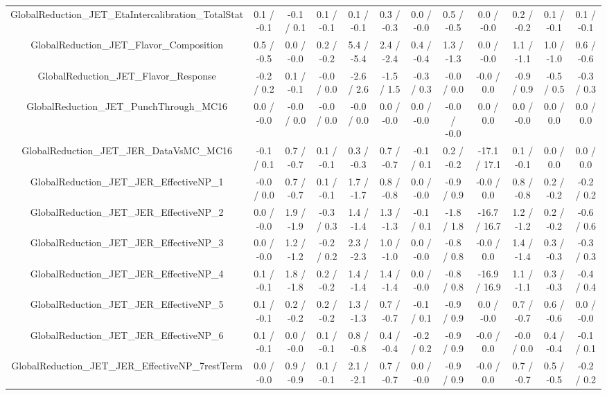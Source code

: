 \begin{table}[htbp]
\begin{center}
\begin{tabular}{|c|c|c|c|c|c|c|c|c|c|c|c|}
  GlobalReduction_JET_EtaIntercalibration_TotalStat & 0.1 / -0.1 & -0.1 / 0.1 & 0.1 / -0.1 & 0.1 / -0.1 & 0.3 / -0.3 & 0.0 / -0.0 & 0.5 / -0.5 & 0.0 / -0.0 & 0.2 / -0.2 & 0.1 / -0.1 & 0.1 / -0.1 \\ 
  GlobalReduction_JET_Flavor_Composition & 0.5 / -0.5 & 0.0 / -0.0 & 0.2 / -0.2 & 5.4 / -5.4 & 2.4 / -2.4 & 0.4 / -0.4 & 1.3 / -1.3 & 0.0 / -0.0 & 1.1 / -1.1 & 1.0 / -1.0 & 0.6 / -0.6 \\ 
  GlobalReduction_JET_Flavor_Response & -0.2 / 0.2 & 0.1 / -0.1 & -0.0 / 0.0 & -2.6 / 2.6 & -1.5 / 1.5 & -0.3 / 0.3 & -0.0 / 0.0 & -0.0 / 0.0 & -0.9 / 0.9 & -0.5 / 0.5 & -0.3 / 0.3 \\ 
  GlobalReduction_JET_PunchThrough_MC16 & 0.0 / -0.0 & -0.0 / 0.0 & -0.0 / 0.0 & -0.0 / 0.0 & 0.0 / -0.0 & 0.0 / -0.0 & -0.0 / -0.0 & 0.0 / 0.0 & 0.0 / -0.0 & 0.0 / 0.0 & 0.0 / 0.0 \\ 
  GlobalReduction_JET_JER_DataVsMC_MC16 & -0.1 / 0.1 & 0.7 / -0.7 & 0.1 / -0.1 & 0.3 / -0.3 & 0.7 / -0.7 & -0.1 / 0.1 & 0.2 / -0.2 & -17.1 / 17.1 & 0.1 / -0.1 & 0.0 / 0.0 & 0.0 / 0.0 \\ 
  GlobalReduction_JET_JER_EffectiveNP_1 & -0.0 / 0.0 & 0.7 / -0.7 & 0.1 / -0.1 & 1.7 / -1.7 & 0.8 / -0.8 & 0.0 / -0.0 & -0.9 / 0.9 & -0.0 / 0.0 & 0.8 / -0.8 & 0.2 / -0.2 & -0.2 / 0.2 \\ 
  GlobalReduction_JET_JER_EffectiveNP_2 & 0.0 / -0.0 & 1.9 / -1.9 & -0.3 / 0.3 & 1.4 / -1.4 & 1.3 / -1.3 & -0.1 / 0.1 & -1.8 / 1.8 & -16.7 / 16.7 & 1.2 / -1.2 & 0.2 / -0.2 & -0.6 / 0.6 \\ 
  GlobalReduction_JET_JER_EffectiveNP_3 & 0.0 / -0.0 & 1.2 / -1.2 & -0.2 / 0.2 & 2.3 / -2.3 & 1.0 / -1.0 & 0.0 / -0.0 & -0.8 / 0.8 & -0.0 / 0.0 & 1.4 / -1.4 & 0.3 / -0.3 & -0.3 / 0.3 \\ 
  GlobalReduction_JET_JER_EffectiveNP_4 & 0.1 / -0.1 & 1.8 / -1.8 & 0.2 / -0.2 & 1.4 / -1.4 & 1.4 / -1.4 & 0.0 / -0.0 & -0.8 / 0.8 & -16.9 / 16.9 & 1.1 / -1.1 & 0.3 / -0.3 & -0.4 / 0.4 \\ 
  GlobalReduction_JET_JER_EffectiveNP_5 & 0.1 / -0.1 & 0.2 / -0.2 & 0.2 / -0.2 & 1.3 / -1.3 & 0.7 / -0.7 & -0.1 / 0.1 & -0.9 / 0.9 & 0.0 / -0.0 & 0.7 / -0.7 & 0.6 / -0.6 & 0.0 / -0.0 \\ 
  GlobalReduction_JET_JER_EffectiveNP_6 & 0.1 / -0.1 & 0.0 / -0.0 & 0.1 / -0.1 & 0.8 / -0.8 & 0.4 / -0.4 & -0.2 / 0.2 & -0.9 / 0.9 & -0.0 / 0.0 & -0.0 / 0.0 & 0.4 / -0.4 & -0.1 / 0.1 \\ 
  GlobalReduction_JET_JER_EffectiveNP_7restTerm & 0.0 / -0.0 & 0.9 / -0.9 & 0.1 / -0.1 & 2.1 / -2.1 & 0.7 / -0.7 & 0.0 / -0.0 & -0.9 / 0.9 & -0.0 / 0.0 & 0.7 / -0.7 & 0.5 / -0.5 & -0.2 / 0.2 \\ 

\end{tabular}
\end{center}
\end{table}
